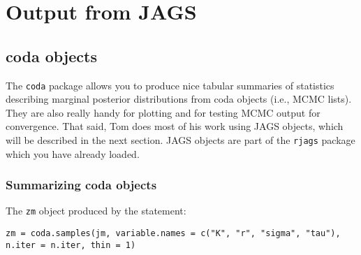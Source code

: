 \documentclass[12pt,english]{article}
\begin{document}
\section{Output from JAGS}

\subsection{coda objects}

The \texttt{coda} package \citep{Plummer2016coda} allows you to produce nice tabular summaries of statistics describing marginal posterior distributions from coda objects (i.e., MCMC lists). They are also really handy for plotting and for testing MCMC output for convergence. That said, Tom does most of his work using JAGS objects, which will be described in the next section. JAGS objects are part of the \texttt{rjags} package which you have already loaded.

\subsubsection{Summarizing coda objects}

The \texttt{zm} object produced by the statement:

\begin{Verbatim}
zm = coda.samples(jm, variable.names = c("K", "r", "sigma", "tau"), 
n.iter = n.iter, thin = 1)
\end{Verbatim}
\end{document}
